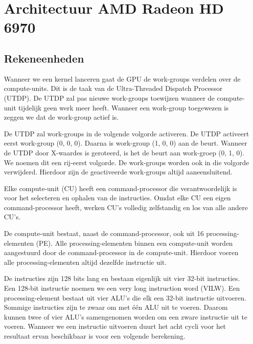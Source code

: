 
\section{Architectuur AMD Radeon HD 6970}
\subsection{Rekeneenheden}

Wanneer we een kernel lanceren gaat de GPU de work-groups verdelen over de compute-units. Dit is de taak van de Ultra-Threaded Dispatch Processor (UTDP). De UTDP zal pas nieuwe work-groups toewijzen wanneer de compute-unit tijdelijk geen werk meer heeft.  Wanneer een work-group toegewezen is zeggen we dat de work-group actief is. 

\label{WGvolg}
De UTDP zal work-groups in de volgende volgorde activeren. De UTDP activeert eerst work-group (0, 0, 0). Daarna is work-group (1, 0, 0) aan de beurt. Wanneer de UTDP door X-waardes is geroteerd, is het de beurt aan work-groep (0, 1, 0). We noemen dit een rij-eerst volgorde. De work-groups worden ook in die volgorde verwijderd. Hierdoor zijn de geactiveerde work-groups altijd aaneensluitend.\cite[p.~6-8]{amd}

Elke compute-unit (CU) heeft een command-processor die verantwoordelijk is voor het selecteren en ophalen van de instructies. Omdat elke CU een eigen command-processor heeft, werken CU's volledig zelfstandig en los van alle andere CU's.

De compute-unit bestaat, naast de command-processor, ook uit 16 processing-elementen (PE). Alle processing-elementen binnen een compute-unit worden aangestuurd door de command-processor in de compute-unit. Hierdoor voeren alle processing-elementen altijd dezelfde instructie uit.

De instructies zijn 128 bits lang en bestaan eigenlijk uit vier 32-bit instructies. Een 128-bit instructie noemen we een very long instruction word (VILW). Een processing-element bestaat uit vier ALU's die elk een 32-bit instructie uitvoeren. Sommige instructies zijn te zwaar om met \'e\'en ALU uit te voeren. Daarom kunnen twee of vier ALU's samengenomen worden om een zware instructie uit te voeren. Wanneer we een instructie uitvoeren duurt het acht cycli voor het resultaat ervan beschikbaar is voor een volgende berekening.

